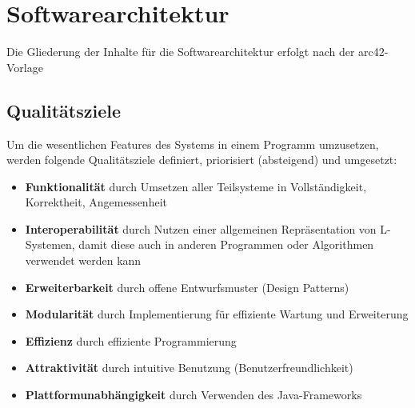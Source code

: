 \section{Softwarearchitektur}
Die Gliederung der Inhalte für die Softwarearchitektur erfolgt nach der arc42-Vorlage~\cite{arc42}

\subsection*{Qualitätsziele}
Um die wesentlichen Features des Systems in einem Programm umzusetzen, werden folgende Qualitätsziele definiert,
priorisiert (absteigend) und umgesetzt:
\begin{itemize}
    \item \textbf{Funktionalität} durch Umsetzen aller Teilsysteme in Vollständigkeit, Korrektheit, Angemessenheit
    \item \textbf{Interoperabilität} durch Nutzen einer allgemeinen Repräsentation von L-Systemen, damit diese
    auch in anderen Programmen oder Algorithmen verwendet werden kann
    \item \textbf{Erweiterbarkeit} durch offene Entwurfsmuster (Design Patterns)
    \item \textbf{Modularität} durch Implementierung für effiziente Wartung und Erweiterung
    \item \textbf{Effizienz} durch effiziente Programmierung
    \item \textbf{Attraktivität} durch intuitive Benutzung (Benutzerfreundlichkeit)
    \item \textbf{Plattformunabhängigkeit} durch Verwenden des Java-Frameworks
\end{itemize}

\newpage

